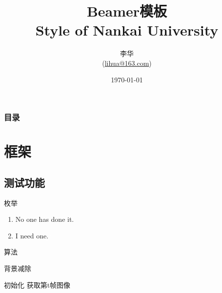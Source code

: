 \documentclass[UTF8]{beamer}
\title[Beamer模板]{Beamer模板\\Style of Nankai University}
\author[李华]{李华\\(\url{lihua@163.com})}
\institute{南开大学XX学院}
\date{\today}
\begin{document}

\renewcommand{\contentsname}{目录}     %
\renewcommand{\abstractname}{摘要}     %
\renewcommand{\refname}{参考文献}      %
\renewcommand{\indexname}{索引}
\renewcommand{\figurename}{图}
\renewcommand{\tablename}{表}
\renewcommand{\appendixname}{附录}
\begin{frame}[plain]
\maketitle
\end{frame}


\begin{frame}
\frametitle{目录}
\tableofcontents
\end{frame}
\section{框架}

\subsection{测试功能}

\begin{frame}{枚举}
    \begin{enumerate}
        \item No one has done it.
        \item I need one.
    \end{enumerate}
\end{frame}

\begin{frame}{算法}
    \begin{algorithm}[H]
        \caption{背景减除}
        \begin{algorithmic}[1]
            \STATE 初始化
            \REPEAT
            \STATE 获取第t帧图像
        \end{algorithmic}
    \end{algorithm}
\end{frame}
\end{document}
